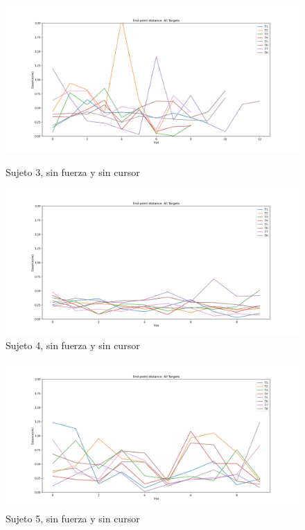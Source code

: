 \documentclass[a4paper,11pt, oneside]{book}
\begin{document}
\begin{figure}[H]
	\begin{minipage}[b]{0.5\linewidth}
		\centering
		\includegraphics[width=\linewidth]{sujeto3/no_force_no_cursor/evolution_distance}
		\caption{Sujeto 3, sin fuerza y sin cursor}
		\label{fig:figura1}
	\end{minipage}
	\hspace{0.5cm}
	\begin{minipage}[b]{0.5\linewidth}
		\centering
		\includegraphics[width=\linewidth]{sujeto4/no_force_no_cursor/evolution_distance}
		\caption{Sujeto 4, sin fuerza y sin cursor}
		\label{fig:figura2}
	\end{minipage}
\end{figure}
\begin{figure}[H]
	\begin{minipage}[b]{0.5\linewidth}
		\centering
		\includegraphics[width=\linewidth]{sujeto5/no_force_no_cursor/evolution_distance}
		\caption{Sujeto 5, sin fuerza y sin cursor}
		\label{fig:figura1}
	\end{minipage}
\end{figure}
\end{document}
